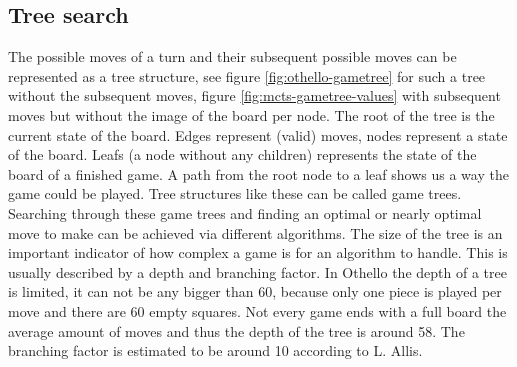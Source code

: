 \documentclass[11pt,a4paper]{article}
\begin{document}
\subsection{Tree search}
The possible moves of a turn and their subsequent possible moves can be represented as a tree structure, see figure \ref{fig:othello-gametree} for such a tree without the subsequent moves, figure \ref{fig:mcts-gametree-values} with subsequent moves but without the image of the board per node. The root of the tree is the current state of the board. Edges represent (valid) moves, nodes represent a state of the board. Leafs (a node without any children) represents the state of the board of a finished game. A path from the root node to a leaf shows us a way the game could be played. Tree structures like these can be called game trees. Searching through these game trees and finding an optimal or nearly optimal move to make can be achieved via different algorithms. The size of the tree is an important indicator of how complex a game is for an algorithm to handle. This is usually described by a depth and branching factor. In Othello the depth of a tree is limited, it can not be any bigger than 60, because only one piece is played per move and there are 60 empty squares. Not every game ends with a full board the average amount of moves and thus the depth of the tree is around 58. The branching factor is estimated to be around 10 according to L. Allis\cite{Allis:1994}.
\end{document}
